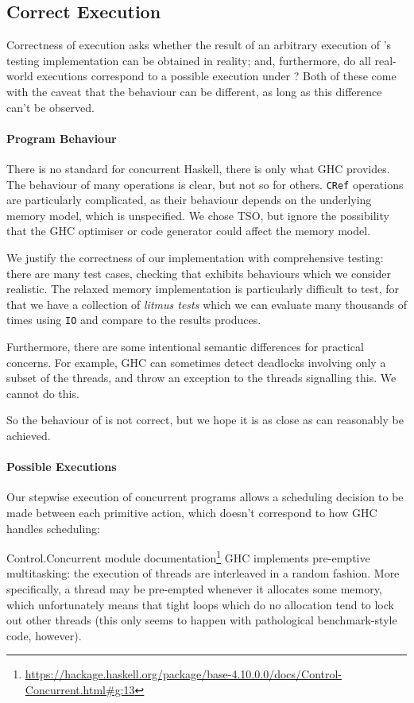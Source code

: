 \subsection{Correct Execution}

Correctness of execution asks whether the result of an arbitrary
execution of \dejafu{}'s testing implementation can be obtained in
reality; and, furthermore, do all real-world executions correspond to
a possible execution under \dejafu{}?  Both of these come with the
caveat that the behaviour can be different, as long as this difference
can't be observed.

\paragraph{Program Behaviour}
There is no standard for concurrent Haskell, there is only what GHC
provides.  The behaviour of many operations is clear, but not so for
others.  \verb|CRef| operations are particularly complicated, as their
behaviour depends on the underlying memory model, which is
unspecified.  We chose TSO, but ignore the possibility that the GHC
optimiser or code generator could affect the memory model.

We justify the correctness of our implementation with comprehensive
testing: there are many test cases, checking that \dejafu{} exhibits
behaviours which we consider realistic.  The relaxed memory
implementation is particularly difficult to test, for that we have a
collection of \emph{litmus tests} which we can evaluate many thousands
of times using \verb|IO| and compare to the results \dejafu{}
produces.

Furthermore, there are some intentional semantic differences for
practical concerns.  For example, GHC can sometimes detect deadlocks
involving only a subset of the threads, and throw an exception to the
threads signalling this.  We cannot do this.

So the behaviour of \dejafu{} is not correct, but we hope it is as
close as can reasonably be achieved.

\paragraph{Possible Executions}
Our stepwise execution of concurrent programs allows a scheduling
decision to be made between each primitive action, which doesn't
correspond to how GHC handles scheduling:

\begin{bquote}{Control.Concurrent module documentation\footnote{\url{https://hackage.haskell.org/package/base-4.10.0.0/docs/Control-Concurrent.html\#g:13}}}
  GHC implements pre-emptive multitasking: the execution of threads
  are interleaved in a random fashion.  More specifically, a thread may
  be pre-empted whenever it allocates some memory, which unfortunately
  means that tight loops which do no allocation tend to lock out other
  threads (this only seems to happen with pathological benchmark-style
  code, however).
\end{bquote}


